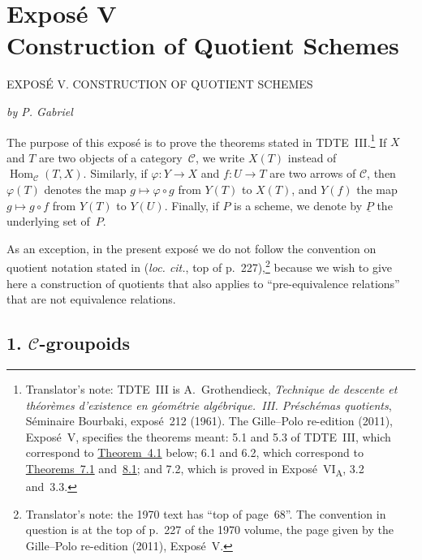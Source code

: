 
\chapter*{Expos\'e V\\Construction of Quotient Schemes}
\label{exp:sga3-V}
%
  {EXPOS\'E V. CONSTRUCTION OF QUOTIENT SCHEMES}

\begin{center}
  \textit{by P. Gabriel}
\end{center}

The purpose of this expos\'e is to prove the theorems stated in TDTE~III.\footnote{Translator's note: TDTE~III is A.~Grothendieck, \emph{Technique de
descente et théorèmes d'existence en géométrie algébrique.~III. Préschémas
quotients}, Séminaire Bourbaki, exposé~212 (1961). The Gille--Polo
re-edition (2011), Exposé~V, specifies the theorems meant: 5.1 and 5.3 of
TDTE~III, which correspond to \hyperref[thm:sga3-V-4.1]{Theorem~4.1} below; 6.1 and 6.2, which correspond to
\hyperref[thm:sga3-V-7.1]{Theorems~7.1} and~\hyperref[thm:sga3-V-8.1]{8.1}; and 7.2, which is proved in Exposé~VI\textsubscript{A}, 3.2
and~3.3.}
If \(X\) and \(T\) are two objects of a category~\(\mathscr C\), we write
\(X(T)\) instead of \(\operatorname{Hom}_{\mathscr C}(T,X)\). Similarly, if
\(\varphi:Y\to X\) and \(f:U\to T\) are two arrows of \(\mathscr C\), then
\(\varphi(T)\) denotes the map \(g\mapsto\varphi\circ g\) from \(Y(T)\) to
\(X(T)\), and \(Y(f)\) the map \(g\mapsto g\circ f\) from \(Y(T)\) to
\(Y(U)\). Finally, if \(P\) is a scheme, we denote by \(\underline P\) the underlying
set of~\(P\).

As an exception, in the present expos\'e we do not follow the convention on
quotient notation stated in  (\emph{loc. cit.}, top of p.~227),\footnote{Translator's note: the 1970 text has ``top of page~68''. The
convention in question is at the top of p.~227 of the 1970 volume, the page
given by the Gille--Polo re-edition (2011), Exposé~V.} because we wish to give here a construction of quotients that
also applies to ``pre-equivalence relations''
that are not equivalence relations.

\section*{1. \(\mathscr C\)-groupoids}
\label{sec:sga3-V-1}

